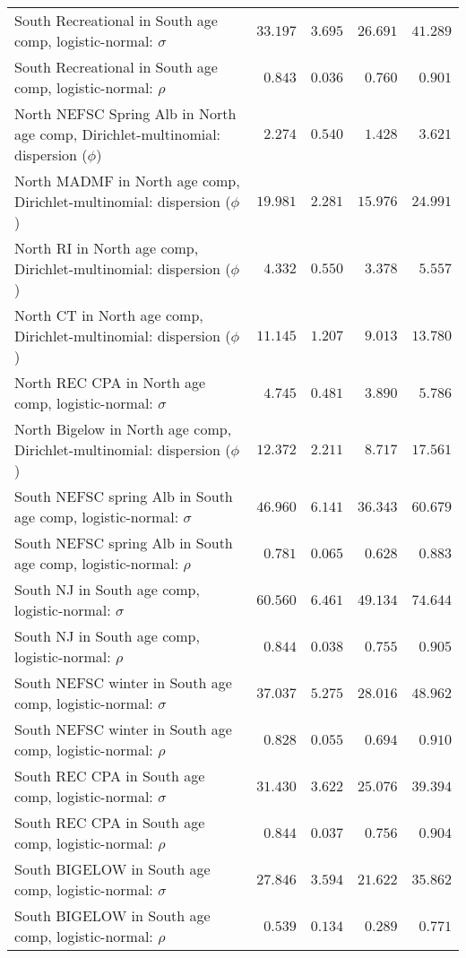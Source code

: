 \documentclass[
]{article}
\begin{document}
\begin{landscape}
\begin{longtable}[t]{lrrrr}
South Recreational in South age comp, logistic-normal: $\sigma$ & $33.197$ & $3.695$ & $26.691$ & $41.289$\\
South Recreational in South age comp, logistic-normal: $\rho$ & $0.843$ & $0.036$ & $0.760$ & $0.901$\\
\addlinespace
North NEFSC Spring Alb in North age comp, Dirichlet-multinomial: dispersion ($\phi$) & $2.274$ & $0.540$ & $1.428$ & $3.621$\\
North MADMF in North age comp, Dirichlet-multinomial: dispersion ($\phi$) & $19.981$ & $2.281$ & $15.976$ & $24.991$\\
North RI in North age comp, Dirichlet-multinomial: dispersion ($\phi$) & $4.332$ & $0.550$ & $3.378$ & $5.557$\\
North CT in North age comp, Dirichlet-multinomial: dispersion ($\phi$) & $11.145$ & $1.207$ & $9.013$ & $13.780$\\
North REC CPA in North age comp, logistic-normal: $\sigma$ & $4.745$ & $0.481$ & $3.890$ & $5.786$\\
\addlinespace
North Bigelow in North age comp, Dirichlet-multinomial: dispersion ($\phi$) & $12.372$ & $2.211$ & $8.717$ & $17.561$\\
South NEFSC spring Alb in South age comp, logistic-normal: $\sigma$ & $46.960$ & $6.141$ & $36.343$ & $60.679$\\
South NEFSC spring Alb in South age comp, logistic-normal: $\rho$ & $0.781$ & $0.065$ & $0.628$ & $0.883$\\
South NJ in South age comp, logistic-normal: $\sigma$ & $60.560$ & $6.461$ & $49.134$ & $74.644$\\
South NJ in South age comp, logistic-normal: $\rho$ & $0.844$ & $0.038$ & $0.755$ & $0.905$\\
\addlinespace
South NEFSC winter in South age comp, logistic-normal: $\sigma$ & $37.037$ & $5.275$ & $28.016$ & $48.962$\\
South NEFSC winter in South age comp, logistic-normal: $\rho$ & $0.828$ & $0.055$ & $0.694$ & $0.910$\\
South REC CPA in South age comp, logistic-normal: $\sigma$ & $31.430$ & $3.622$ & $25.076$ & $39.394$\\
South REC CPA in South age comp, logistic-normal: $\rho$ & $0.844$ & $0.037$ & $0.756$ & $0.904$\\
South BIGELOW in South age comp, logistic-normal: $\sigma$ & $27.846$ & $3.594$ & $21.622$ & $35.862$\\
\addlinespace
South BIGELOW in South age comp, logistic-normal: $\rho$ & $0.539$ & $0.134$ & $0.289$ & $0.771$\\

\end{longtable}
\end{landscape}
\end{document}
